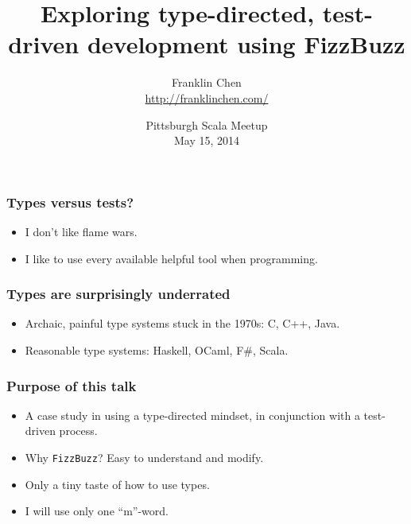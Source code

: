 \usepackage{minted}


\title{Exploring type-directed, test-driven development using FizzBuzz}
\author{Franklin Chen \\ \url{http://franklinchen.com/}}
\date{Pittsburgh Scala Meetup \\
May 15, 2014
}



\begin{frame}
  \titlepage
\end{frame}


\begin{frame}
  \frametitle{Types versus tests?}

  \begin{itemize}
  \item I don't like flame wars.
  \item I like to use every available helpful tool when programming.
  \end{itemize}
\end{frame}

\begin{frame}
  \frametitle{Types are surprisingly underrated}

  \begin{itemize}
  \item Archaic, painful type systems stuck in the 1970s: C, C++, Java.
  \item Reasonable type systems: Haskell, OCaml, F\#, Scala.
  \end{itemize}
\end{frame}

\begin{frame}
  \frametitle{Purpose of this talk}

  \begin{itemize}
  \item A case study in using a type-directed mindset, in conjunction with a test-driven process.
  \item Why \texttt{FizzBuzz}? Easy to understand and modify.
  \item Only a tiny taste of how to use types.
  \item I will use only one ``m''-word.
  \end{itemize}
\end{frame}

